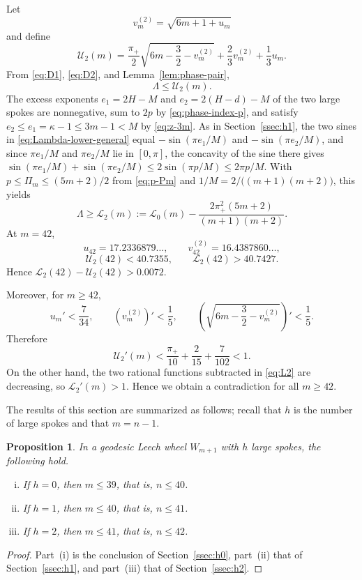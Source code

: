 \documentclass[11pt]{article}
\newtheorem{proposition}[theorem]{Proposition}
\theoremstyle{definition}
\theoremstyle{remark}
\numberwithin{equation}{section}
\begin{document}
Let
\[
  v_m^{(2)}=\sqrt{6m+1+u_m}
\]
and define
\[
  \mathcal U_2(m)=
  \frac{\pi_+}{2}\sqrt{6m-\frac32-v_m^{(2)}}
  +\frac23v_m^{(2)}+\frac13u_m.
\]
From \eqref{eq:D1}, \eqref{eq:D2}, and Lemma~\ref{lem:phase-pair},
\[
  \Lambda\le\mathcal U_2(m).
\]
The excess exponents $e_1=2H-M$ and $e_2=2(H-d)-M$ of the two large spokes
are nonnegative, sum to $2p$ by \eqref{eq:phase-index-p}, and satisfy
$e_2\le e_1=\kappa-1\le3m-1<M$ by \eqref{eq:z-3m}. As in
Section~\ref{ssec:h1}, the two sines in \eqref{eq:Lambda-lower-general} equal
$-\sin(\pi e_1/M)$ and $-\sin(\pi e_2/M)$, and since $\pi e_1/M$ and
$\pi e_2/M$ lie in $[0,\pi]$, the concavity of the sine there gives
$\sin(\pi e_1/M)+\sin(\pi e_2/M)\le2\sin(\pi p/M)\le2\pi p/M$. With
$p\le\Pi_m\le(5m+2)/2$ from \eqref{eq:p-Pm} and
$1/M=2/\bigl((m+1)(m+2)\bigr)$, this yields
\begin{equation}\label{eq:L2}
  \Lambda\ge\mathcal L_2(m):=
  \mathcal L_0(m)-
  \frac{2\pi_+^2(5m+2)}{(m+1)(m+2)}.
\end{equation}
At $m=42$,
\[
  u_{42}=17.2336879\ldots,
  \qquad
  v_{42}^{(2)}=16.4387860\ldots,
\]
\[
  \mathcal U_2(42)<40.7355,
  \qquad
  \mathcal L_2(42)>40.7427.
\]
Hence $\mathcal L_2(42)-\mathcal U_2(42)>0.0072$.

Moreover, for $m\ge42$,
\[
  u_m'<\frac7{34},
  \qquad
  (v_m^{(2)})'<\frac15,
  \qquad
  \left(\sqrt{6m-\frac32-v_m^{(2)}}\right)'<\frac15.
\]
Therefore
\[
  \mathcal U_2'(m)
  <\frac{\pi_+}{10}+\frac{2}{15}+\frac7{102}<1.
\]
On the other hand, the two rational functions subtracted in \eqref{eq:L2} are decreasing, so $\mathcal L_2'(m)>1$. Hence we obtain a contradiction for all $m\ge42$.

The results of this section are summarized as follows; recall that $h$ is the
number of large spokes and that $m=n-1$.

\begin{proposition}\label{prop:uniform-ranges}
In a geodesic Leech wheel $W_{m+1}$ with $h$ large spokes, the following hold.
\begin{enumerate}[(i)]
\item If $h=0$, then $m\le39$, that is, $n\le40$.
\item If $h=1$, then $m\le40$, that is, $n\le41$.
\item If $h=2$, then $m\le41$, that is, $n\le42$.
\end{enumerate}
\end{proposition}

\begin{proof}
Part~(i) is the conclusion of Section~\ref{ssec:h0}, part~(ii) that of
Section~\ref{ssec:h1}, and part~(iii) that of Section~\ref{ssec:h2}.
\end{proof}
\end{document}

